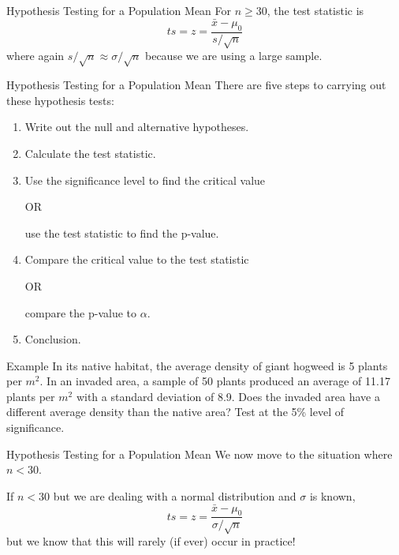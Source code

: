 \begin{frame}{Hypothesis Testing for a Population Mean}
    For $n \ge 30$, the test statistic is
    \[
        ts = z = \frac{\bar{x} - \mu_0}{s / \sqrt{n}}
    \]
    where again $s/\sqrt{n} \approx \sigma/\sqrt{n}$ because we are using a large sample.
\end{frame}

\begin{frame}{Hypothesis Testing for a Population Mean}
    There are five steps to carrying out these hypothesis tests:
    \begin{enumerate}
        \item Write out the null and alternative hypotheses.
        \item Calculate the test statistic.
        \item Use the significance level to find the critical value
            \begin{center}
                OR
            \end{center}
            use the test statistic to find the p-value.
        \item Compare the critical value to the test statistic
            \begin{center}
                OR
            \end{center}
            compare the p-value to $\alpha$.
        \item Conclusion.
    \end{enumerate}
\end{frame}

\begin{frame}{Example}
    In its native habitat, the average density of giant hogweed is 5 plants per $m^2$. In an invaded area, a sample of 50 plants produced an average of 11.17 plants per $m^2$ with a standard deviation of 8.9. Does the invaded area have a different average density than the native area? Test at the 5\% level of significance. 
\end{frame}

\begin{frame}{Hypothesis Testing for a Population Mean}
    We now move to the situation where $n < 30$. 
    
    \vspace{12pt}If $n < 30$ but we are dealing with a normal distribution and $\sigma$ is known,
    \[
        ts = z = \frac{\bar{x} - \mu_0}{\sigma / \sqrt{n}}
    \]
    but we know that this will rarely (if ever) occur in practice!
\end{frame}


